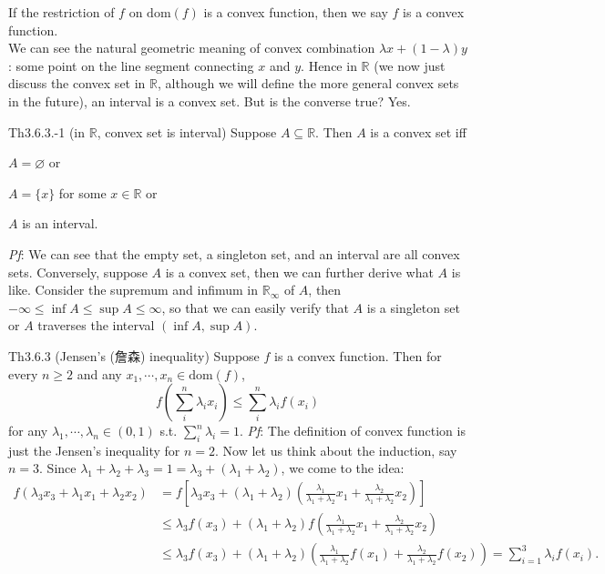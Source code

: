\documentclass{article}
\begin{document}
\begin{Rmk}{}
    \textcolor{Df}{If the restriction of $f$ on $\text{dom}(f)$ is a convex function, then we say $f$ is a convex function.}\\
    We can see the natural geometric meaning of convex combination $\lambda x+(1-\lambda)y$: some point on the line segment connecting $x$ and $y$. Hence in $\mathbb{R}$ (we now just discuss the convex set in $\mathbb{R}$, although we will define the more general convex sets in the future), an interval is a convex set. But is the converse true? Yes.
\end{Rmk}

\begin{Th}{Th3.6.3.-1 (in $\mathbb{R}$, convex set is interval)}
    Suppose $A\subseteq \mathbb{R}$. Then $A$ is a convex set iff
    \begin{compactenum}
        \item $A=\varnothing$ or
        \item $A=\{x\}$ for some $x\in\mathbb{R}$ or
        \item $A$ is an interval.
    \end{compactenum}
    \tcblower
    \textit{Pf}: We can see that the empty set, a singleton set, and an interval are all convex sets. Conversely, suppose $A$ is a convex set, then we can further derive what $A$ is like. Consider the supremum and infimum in $\mathbb{R}_\infty$ of $A$, then $-\infty\leq\inf A \leq\sup A\leq\infty$, so that we can easily verify that $A$ is a singleton set or $A$ traverses the interval $(\inf A, \sup A)$.
\end{Th}

\begin{Th}{Th3.6.3 (Jensen's (詹森) inequality)}
    Suppose $f$ is a convex function. Then for every $n\geq 2$ and any $x_1, \cdots, x_n\in\text{dom}(f)$, 
    $$ f\left(\sum_{i}^{n}\lambda_i x_i\right) \leq \sum_{i}^{n}\lambda_i f(x_i) $$
    for any $\lambda_1, \cdots, \lambda_n\in (0,1)$ s.t. $\sum_{i}^{n}\lambda_i = 1$.
    \tcblower
    \textit{Pf}: The definition of convex function is just the Jensen's inequality for $n=2$. Now let us think about the induction, say $n=3$. Since $\lambda_1+\lambda_2+\lambda_3 = 1 = \lambda_3 + (\lambda_1+\lambda_2)$, we come to the idea:
    $$ 
    \begin{aligned}
        f\left(\lambda_3 x_3 + \lambda_1 x_1 + \lambda_2 x_2\right) &= f\left[\lambda_3 x_3 + (\lambda_1 + \lambda_2)\left(\frac{\lambda_1}{\lambda_1+\lambda_2}x_1 + \frac{\lambda_2}{\lambda_1+\lambda_2}x_2\right)\right] \\
        &\leq \lambda_3 f(x_3) + (\lambda_1+\lambda_2)f\left(\frac{\lambda_1}{\lambda_1+\lambda_2}x_1 + \frac{\lambda_2}{\lambda_1+\lambda_2}x_2\right) \\
        &\leq \lambda_3 f(x_3) + (\lambda_1+\lambda_2)\left(\frac{\lambda_1}{\lambda_1+\lambda_2}f(x_1) + \frac{\lambda_2}{\lambda_1+\lambda_2}f(x_2)\right) = \sum_{i=1}^{3}\lambda_i f(x_i).
    \end{aligned} 
    $$
\end{Th}
\end{document}
